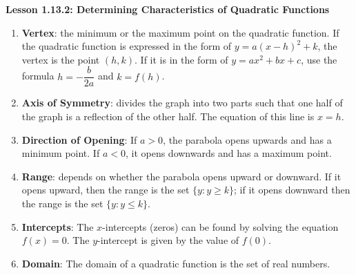 \begin{center}
\textbf{Lesson 1.13.2: Determining Characteristics of Quadratic Functions}
\end{center}


\begin{enumerate}[label=\color{blue}\arabic*. ]
    \item \textbf{Vertex}: the minimum or the maximum point on the quadratic function. If the quadratic function is expressed in the form of $ y = a(x-h)^{2} + k $, the vertex is the point $(h,k)$. If it is in the form of $ y = ax^{2} + bx + c $, use the formula $  h = -\dfrac{b}{2a}$ and $k = f(h)$. 
    
    \item \textbf{Axis of Symmetry}: divides the graph into two parts such that one half of the graph is a reflection of the other half. The equation of this line is $x = h$. 
    
    \item \textbf{Direction of Opening}: If $a > 0$, the parabola opens upwards and has a minimum point. If $a < 0$, it opens downwards and has a maximum point. 
    
    \item \textbf{Range}: depends on whether the parabola opens upward or downward. If it opens upward, then the range is the set $\{y: y \geq k\}$; if it opens downward then the range is the set $\{y: y \leq k\}$. 
    
    \item \textbf{Intercepts}: The $x$-intercepts (zeros) can be found by solving the equation $f(x) = 0$. The $y$-intercept is given by the value of $f(0)$.
    
    \item \textbf{Domain}: The domain of a quadratic function is the set of real numbers. 
\end{enumerate}

 



